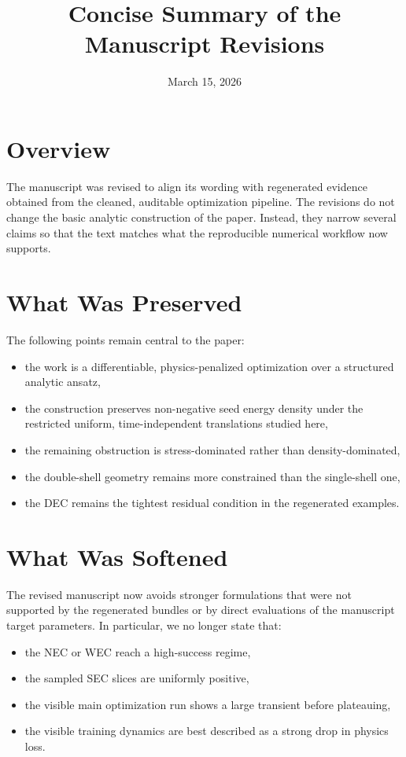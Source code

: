 \documentclass[11pt]{article}
\title{Concise Summary of the Manuscript Revisions}
\author{}
\date{March 15, 2026}
\begin{document}
\maketitle

\section*{Overview}
The manuscript was revised to align its wording with regenerated evidence obtained from the cleaned,
auditable optimization pipeline. The revisions do not change the basic analytic construction of the
paper. Instead, they narrow several claims so that the text matches what the reproducible numerical
workflow now supports.

\section*{What Was Preserved}
The following points remain central to the paper:
\begin{itemize}
\item the work is a differentiable, physics-penalized optimization over a structured analytic ansatz,
\item the construction preserves non-negative seed energy density under the restricted uniform,
time-independent translations studied here,
\item the remaining obstruction is stress-dominated rather than density-dominated,
\item the double-shell geometry remains more constrained than the single-shell one,
\item the DEC remains the tightest residual condition in the regenerated examples.
\end{itemize}

\section*{What Was Softened}
The revised manuscript now avoids stronger formulations that were not supported by the regenerated
bundles or by direct evaluations of the manuscript target parameters. In particular, we no longer
state that:
\begin{itemize}
\item the NEC or WEC reach a high-success regime,
\item the sampled SEC slices are uniformly positive,
\item the visible main optimization run shows a large transient before plateauing,
\item the visible training dynamics are best described as a strong drop in physics loss.
\end{itemize}
\end{document}
